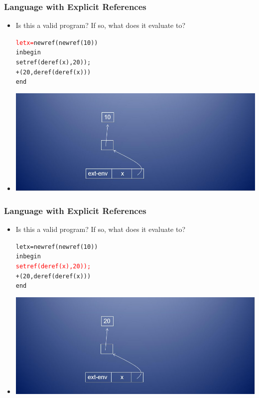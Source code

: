 \documentclass{beamer}
\begin{document}
\begin{frame}[fragile]
\frametitle{Language with Explicit References}
\begin{scriptsize}
\begin{itemize}
\item<1-> Is this a valid program? If so, what does it evaluate to?
\begin{alltt}
\textcolor{red}{let x =} newref(newref(10))
in begin
	setref(deref(x), 20));
	 +(20, deref(deref(x)))
   end
\end{alltt}

\item<1->
\begin{center}
\includegraphics[scale=0.5]{pointer-chain3.jpg}
\end{center}

\end{itemize}
\end{scriptsize}
\end{frame}

\begin{frame}[fragile]
\frametitle{Language with Explicit References}
\begin{scriptsize}
\begin{itemize}
\item<1-> Is this a valid program? If so, what does it evaluate to?
\begin{alltt}
let x = newref(newref(10))
in begin
	\textcolor{red}{setref(deref(x), 20));}
	+(20, deref(deref(x)))
   end
\end{alltt}

\item<1->
\begin{center}
\includegraphics[scale=0.5]{pointer-chain4.jpg}
\end{center}

\end{itemize}
\end{scriptsize}
\end{frame}
\end{document}
